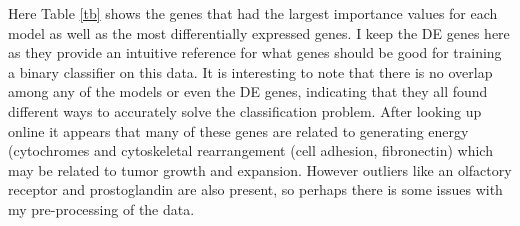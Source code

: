 Here Table \ref{tb} shows the genes that had the largest importance values for each model as well as the most differentially expressed genes.
I keep the DE genes here as they provide an intuitive reference for what genes should be good for training a binary classifier on this data.
It is interesting to note that there is no overlap among any of the models or even the DE genes, indicating that they all found different ways to accurately solve the classification problem.
After looking up online it appears that many of these genes are related to generating energy (cytochromes and cytoskeletal rearrangement (cell adhesion, fibronectin) which may be related to tumor growth and expansion.
However outliers like an olfactory receptor and prostoglandin are also present, so perhaps there is some issues with my pre-processing of the data.

